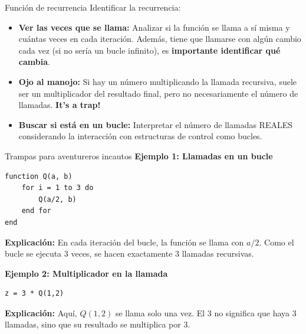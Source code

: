 \documentclass[aspectratio=169]{beamer}
\begin{document}
\begin{frame}{Función de recurrencia}
Identificar la recurrencia:
\begin{itemize}
    
    \item \textbf{Ver las veces que se llama:} Analizar si la función se llama a sí misma y cuántas veces en cada iteración. Además, tiene que llamarse con algún cambio cada vez (si no sería un bucle infinito), es \textbf{importante identificar qué cambia}.
    
    \item \textbf{Ojo al manojo:} Si hay un número multiplicando la llamada recursiva, suele ser un multiplicador del resultado final, pero no necesariamente el número de llamadas. \textbf{It's a trap!}
    
    \item \textbf{Buscar si está en un bucle:} Interpretar el número de llamadas REALES considerando la interacción con estructuras de control como bucles.
\end{itemize}
\end{frame}


\begin{frame}[fragile]{Trampas para aventureros incautos}
\textbf{Ejemplo 1: Llamadas en un bucle}
\begin{lstlisting}
function Q(a, b)
    for i = 1 to 3 do
        Q(a/2, b)
    end for
end
\end{lstlisting}
\textbf{Explicación:} 
En cada iteración del bucle, la función se llama con $a/2$. Como el bucle se ejecuta 3 veces, se hacen exactamente 3 llamadas recursivas.

\textbf{Ejemplo 2: Multiplicador en la llamada}
\begin{lstlisting}
z = 3 * Q(1,2)
\end{lstlisting}
\textbf{Explicación:} 
Aquí, $Q(1,2)$ se llama solo una vez. El 3 no significa que haya 3 llamadas, sino que su resultado se multiplica por 3.
\end{frame}
\end{document}
